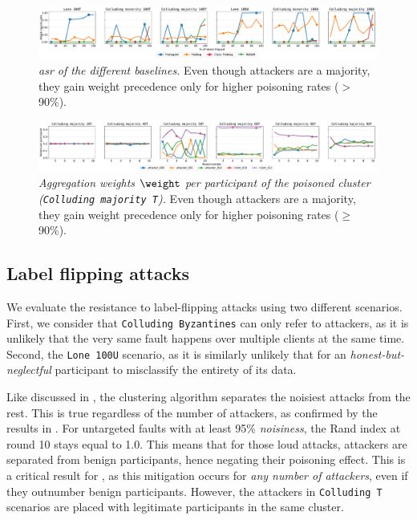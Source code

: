 \begin{figure} %
  \centering 
  \includegraphics[width=\linewidth]{figures/poisoning/asr_multiple_baselines.pdf}    
  \caption{
    \emph{\Acrfull{asr} of the different baselines.}
    Even though attackers are a majority, they gain weight precedence only for higher poisoning rates ($>$90\%).  
  }
  \label{fig:asr_multiple_baselines}
\end{figure}

\begin{figure} %
  \centering     
    \includegraphics[width=\linewidth]{figures/reput/majority_attackers_targeted_multiple_percents.pdf}    
  \caption{
    \emph{Aggregation weights $\weight$ per participant of the poisoned cluster (\texttt{Colluding majority T}).}
    Even though attackers are a majority, they gain weight precedence only for higher poisoning rates ($\ge$90\%).  
  }
  \label{fig:majority_targeted_flipping_effect}
\end{figure}


\subsection{Label flipping attacks\label{sec:radar.results.flipping}}

We evaluate the resistance to label-flipping attacks using two different scenarios.
First, we consider that \texttt{Colluding Byzantines} can only refer to attackers, as it is unlikely that the very same fault happens over multiple clients at the same time.
Second, the \texttt{Lone~100U} scenario, as it is similarly unlikely that for an \emph{honest-but-neglectful} participant to misclassify the entirety of its data.

Like discussed in , the clustering algorithm separates the noisiest attacks from the rest.
This is true regardless of the number of attackers, as confirmed by the results in .
For untargeted faults with at least 95\% \emph{noisiness}, the Rand index at round 10 stays equal to 1.0.
This means that for those loud attacks, attackers are separated from benign participants, hence negating their poisoning effect.
This is a critical result for \thecontrib, as this mitigation occurs for \emph{any number of attackers}, even if they outnumber benign participants.
However, the attackers in \texttt{Colluding T} scenarios are placed with legitimate participants in the same cluster. 


